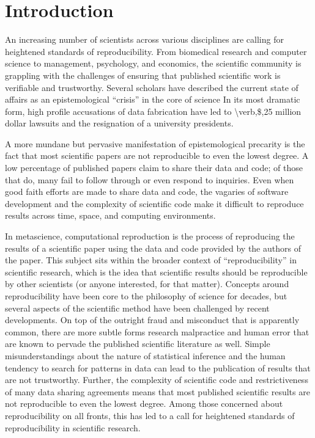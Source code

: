
\hypertarget{introduction}{%
\section{Introduction}\label{introduction}}

An increasing number of scientists across various disciplines are calling for heightened standards of reproducibility. From biomedical research and computer science to management, psychology, and economics, the scientific community is grappling with the challenges of ensuring that published scientific work is verifiable and trustworthy. Several scholars have described the current state of affairs as an epistemological ``crisis'' in the core of science\linebreak
In its most dramatic form, high profile accusations of data fabrication have led to \textbackslash{}verb,\$,25 million dollar lawsuits and the resignation of a university presidents. 

A more mundane but pervasive manifestation of epistemological precarity is the fact that most scientific papers are not reproducible to even the lowest degree. A low percentage of published papers claim to share their data and code; of those that do, many fail to follow through or even respond to inquiries. Even when good faith efforts are made to share data and code, the vagaries of software development and the complexity of scientific code make it difficult to reproduce results across time, space, and computing environments.
 

In metascience, computational reproduction is the process of reproducing the results of a scientific paper using the data and code provided by the authors of the paper. This subject sits within the broader context of ``reproducibility'' in scientific  research, which is the idea that scientific results should be reproducible by other scientists (or anyone interested, for that matter). Concepts around reproducibility have been core to the philosophy of science for decades, but several aspects of the scientific method have been challenged by recent developments. On top of the outright fraud and misconduct that is apparently common, there are more subtle forms research malpractice and human error that are known to pervade the published scientific literature as well. Simple misunderstandings about the nature of statistical inference and the human tendency to search for patterns in data can lead to the publication of results that are not trustworthy. Further, the complexity of scientific code and restrictiveness of many data sharing agreements means that most published scientific results are not reproducible to even the lowest degree. 
Among those concerned about reproducibility on all fronts, this has led to a call for heightened standards of reproducibility in scientific research. 

